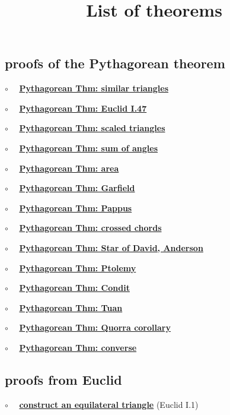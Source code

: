 \documentclass[11pt, oneside]{article}
\title{List of theorems}
\date{}
\begin{document}
\maketitle
\Large


\subsection*{proofs of the Pythagorean theorem}

$\circ$ \ \ \hyperref[sec:Pythagoras_similar_triangles]{\textbf{Pythagorean Thm:  similar triangles}}

$\circ$ \ \ \hyperref[sec:Euclid_I_47]{\textbf{Pythagorean Thm: Euclid I.47 }}

$\circ$ \ \ \hyperref[sec:Pythagoras_scaled_triangles]{\textbf{Pythagorean Thm:  scaled triangles}}

$\circ$ \ \ \hyperref[sec:pthm_sum_angles]{\textbf{Pythagorean Thm:  sum of angles}}

$\circ$ \ \ \hyperref[sec:Pythagoras_area]{\textbf{Pythagorean Thm:  area}}

$\circ$ \ \ \hyperref[sec:Garfield]{\textbf{Pythagorean Thm: Garfield }}

$\circ$ \ \ \hyperref[sec:PProof_Pappus]{\textbf{Pythagorean Thm:  Pappus}}

$\circ$ \ \ \hyperref[sec:PProof_chords]{\textbf{Pythagorean Thm:  crossed chords}}

$\circ$ \ \ \hyperref[sec:star_of_david]{\textbf{Pythagorean Thm:  Star of David, Anderson}}

$\circ$ \ \ \hyperref[sec:PProof_Ptolemy]{\textbf{Pythagorean Thm: Ptolemy }}

$\circ$ \ \ \hyperref[sec:Condit]{\textbf{Pythagorean Thm:  Condit}}

$\circ$ \ \ \hyperref[sec:Pthm_Tuan]{\textbf{Pythagorean Thm:  Tuan}}

$\circ$ \ \ \hyperref[sec:Quorra]{\textbf{Pythagorean Thm:  Quorra corollary}}

$\circ$ \ \ \hyperref[sec:Pythagorean_theorem_converse]{\textbf{Pythagorean Thm:  converse}}


\subsection*{proofs from Euclid}

$\circ$ \ \ \hyperref[sec:Euclid_I_1]{\textbf{construct an equilateral triangle}} (Euclid I.1)
\end{document}
